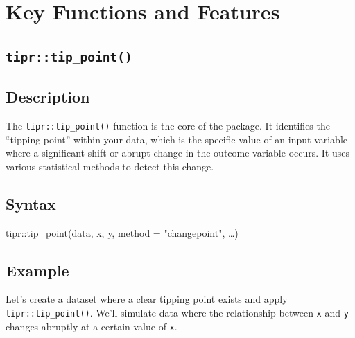 \documentclass[
  10pt,
  letterpaper,
  DIV=11,
  numbers=noendperiod]{scrartcl}
\newenvironment{Shaded}{\begin{snugshade}}{\end{snugshade}}
\newcommand{\AttributeTok}[1]{\textcolor[rgb]{0.40,0.45,0.13}{#1}}
\newcommand{\FunctionTok}[1]{\textcolor[rgb]{0.28,0.35,0.67}{#1}}
\newcommand{\NormalTok}[1]{\textcolor[rgb]{0.00,0.23,0.31}{#1}}
\newcommand{\SpecialCharTok}[1]{\textcolor[rgb]{0.37,0.37,0.37}{#1}}
\newcommand{\StringTok}[1]{\textcolor[rgb]{0.13,0.47,0.30}{#1}}
\begin{document}
\section{Key Functions and Features}\label{key-functions-and-features}

\subsection{\texorpdfstring{\texttt{tipr::tip\_point()}}{tipr::tip\_point()}}\label{tiprtip_point}

\subsection{Description}\label{description}

The \texttt{tipr::tip\_point()} function is the core of the package. It
identifies the ``tipping point'' within your data, which is the specific
value of an input variable where a significant shift or abrupt change in
the outcome variable occurs. It uses various statistical methods to
detect this change.

\subsection{Syntax}\label{syntax}

\begin{Shaded}
\begin{Highlighting}[]
\NormalTok{tipr}\SpecialCharTok{::}\FunctionTok{tip\_point}\NormalTok{(data, x, y, }\AttributeTok{method =} \StringTok{"changepoint"}\NormalTok{, …)}
\end{Highlighting}
\end{Shaded}

\subsection{Example}\label{example}

Let's create a dataset where a clear tipping point exists and apply
\texttt{tipr::tip\_point()}. We'll simulate data where the relationship
between \texttt{x} and \texttt{y} changes abruptly at a certain value of
\texttt{x}.
\end{document}

